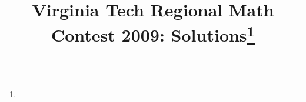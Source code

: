 \documentclass[10pt]{article}
\begin{document}
\title{Virginia Tech Regional Math Contest 2009: Solutions\footnote{\disclaimer}}
\author{\vspace{-2ex}}
\date{\vspace{-5ex}} %
\maketitle

%

%

%

%

%

%

%
\end{document}
